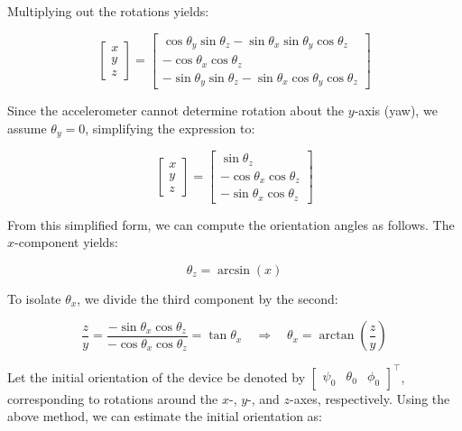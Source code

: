 \documentclass{article}
\begin{document}
    Multiplying out the rotations yields:

    \[
        \begin{bmatrix}
            x \\
            y \\
            z
        \end{bmatrix}
        =
        \begin{bmatrix}
            \cos\theta_{y}\sin\theta_{z}- \sin\theta_{x}\sin\theta_{y}\cos\theta_{z}  \\
            -\cos\theta_{x}\cos\theta_{z}                                             \\
            -\sin\theta_{y}\sin\theta_{z}- \sin\theta_{x}\cos\theta_{y}\cos\theta_{z}
        \end{bmatrix}
    \]

    Since the accelerometer cannot determine rotation about the $y$-axis (yaw), we
    assume $\theta_{y}= 0$, simplifying the expression to:

    \[
        \begin{bmatrix}
            x \\
            y \\
            z
        \end{bmatrix}
        =
        \begin{bmatrix}
            \sin\theta_{z}                \\
            -\cos\theta_{x}\cos\theta_{z} \\
            -\sin\theta_{x}\cos\theta_{z}
        \end{bmatrix}
    \]

    From this simplified form, we can compute the orientation angles as follows.
    The $x$-component yields:

    \[
        \theta_{z}= \arcsin(x)
    \]

    To isolate $\theta_{x}$, we divide the third component by the second:

    \[
        \frac{z}{y}= \frac{-\sin\theta_{x}\cos\theta_{z}}{-\cos\theta_{x}\cos\theta_{z}}
        = \tan\theta_{x}\quad \Rightarrow \quad \theta_{x}= \arctan\left(\frac{z}{y}
        \right)
    \]

    Let the initial orientation of the device be denoted by $\begin{bmatrix}
        \psi_{0} & \theta_{0} & \phi_{0}
    \end{bmatrix}^{\top}$, corresponding to rotations around the $x$-, $y$-, and
    $z$-axes, respectively. Using the above method, we can estimate the initial
    orientation as:
\end{document}
